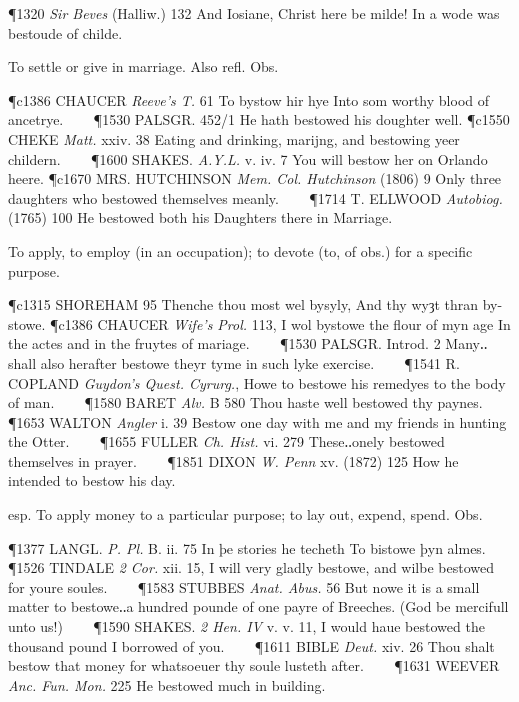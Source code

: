 \begin{description}[wide, labelwidth=!, labelindent=0pt]
\begin{myenumerate}
\P 1320 \textit{Sir Beves}  (Halliw.) 132 And Iosiane, Christ here be milde! In a wode was bestoude of childe.

 To settle or give in marriage. Also refl. Obs.

\P c1386 CHAUCER  \textit{Reeve's T.} 61 To bystow hir hye Into som worthy blood of ancetrye.    
\P 1530 PALSGR. 452/1 He hath bestowed his doughter well.
\P c1550 CHEKE  \textit{Matt.} xxiv. 38 Eating and drinking, marijng, and bestowing yeer childern.    
\P 1600 SHAKES.  \textit{A.Y.L.} v. iv. 7 You will bestow her on Orlando heere.
\P c1670 MRS. HUTCHINSON  \textit{Mem. Col. Hutchinson} (1806) 9 Only three daughters who bestowed themselves meanly.    
\P 1714 T. ELLWOOD  \textit{Autobiog.} (1765) 100 He bestowed both his Daughters there in Marriage.

 To apply, to employ (in an occupation); to devote (to, of obs.) for a specific purpose.

\P c1315 SHOREHAM 95 Thenche thou most wel bysyly, And thy wyȝt thran by-stowe.
\P c1386 CHAUCER  \textit{Wife's Prol.} 113, I wol bystowe the flour of myn age In the actes and in the fruytes of mariage.    
\P 1530 PALSGR. Introd. 2 Many‥shall also herafter bestowe theyr tyme in such lyke exercise.    
\P 1541 R. COPLAND  \textit{Guydon's Quest. Cyrurg.}, Howe to bestowe his remedyes to the body of man.    
\P 1580 BARET  \textit{Alv.} B 580 Thou haste well bestowed thy paynes.    
\P 1653 WALTON  \textit{Angler} i. 39 Bestow one day with me and my friends in hunting the Otter.    
\P 1655 FULLER  \textit{Ch. Hist.} vi. 279 These‥onely bestowed themselves in prayer.    
\P 1851 DIXON  \textit{W. Penn} xv. (1872) 125 How he intended to bestow his day.

 esp. To apply money to a particular purpose; to lay out, expend, spend. Obs.

\P 1377 LANGL.  \textit{P. Pl.} B. ii. 75 In þe stories he techeth To bistowe þyn almes.    
\P 1526 TINDALE  \textit{2 Cor.} xii. 15, I will very gladly bestowe, and wilbe bestowed for youre soules.    
\P 1583 STUBBES  \textit{Anat. Abus.} 56 But nowe it is a small matter to bestowe‥a hundred pounde of one payre of Breeches. (God be mercifull unto us!)    
\P 1590 SHAKES.  \textit{2 Hen. IV} v. v. 11, I would haue bestowed the thousand pound I borrowed of you.    
\P 1611 BIBLE  \textit{Deut.} xiv. 26 Thou shalt bestow that money for whatsoeuer thy soule lusteth after.    
\P 1631 WEEVER  \textit{Anc. Fun. Mon.} 225 He bestowed much in building.


\end{myenumerate}
\end{description}
